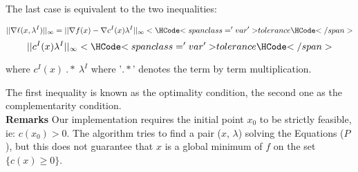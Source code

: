 \begin{itemize}
  The last case is equivalent to the two inequalities:

  $$ || \nabla \ell(x,\lambda^I)||_{\infty} = ||\nabla f(x) - \nabla c^I(x) \lambda^I ||_{\infty} < \var{tolerance} $$
  $$ || c^I(x) \lambda^I ||_{\infty} < \var{tolerance} $$

  where $c^I(x) \: .* \: \lambda^I$ where '$.*$' denotes the term by term multiplication.

  The first inequality is known as the optimality condition, the second one as the complementarity condition.\\

  \textbf{Remarks} Our implementation requires the initial point $x_0$ to be strictly
  feasible, ie: $c(x_0)>0$. The algorithm tries to find a pair ($x$, $\lambda$) solving
  the Equations ($P$), but this does not guarantee that $x$ is a global minimum of $f$ on
  the set $\{c(x)\geq0\}$.

\end{itemize}

